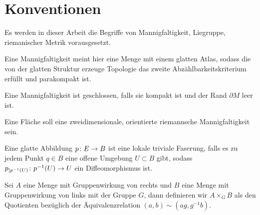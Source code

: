 


\section{Konventionen}
Es werden in dieser Arbeit die Begriffe von Mannigfaltigkeit, Liegruppe,
riemanischer Metrik vorausgesetzt.

Eine Mannigfaltigkeit meint hier eine Menge mit einem glatten Atlas, sodass die von der glatten Struktur erzeuge Topologie das zweite Abzählbarkeitskriterium erfüllt und parakompakt ist.

Eine Mannigfaltigkeit ist geschlossen, falls sie kompakt ist und
der Rand $ \partial M  $ leer ist.

Eine Fläche soll eine zweidimensionale, orientierte riemannsche Mannigfaltigkeit sein.

Eine glatte Abbildung $ p \colon E \rightarrow B $ ist
eine lokale triviale Faserung, falls es zu jedem
Punkt $ q\in B $ eine offene Umgebung $ U\subset B $ gibt, sodass $ p_{|p^{-1}(U)} \colon p^{-1}(U) \rightarrow U $ ein Diffeomorphismus ist.

Sei $ A $ eine Menge mit Gruppenwirkung von rechts und $ B $ 
eine Menge mit Gruppenwirkung von links mit der Gruppe $ G $, dann definieren wir $ A\times_G B $ als den Quotienten bezüglich der
Äquivalenzrelation $ (a,b) \sim (ag,g^{-1}b) $.

%
%
%
%
%
%
%


